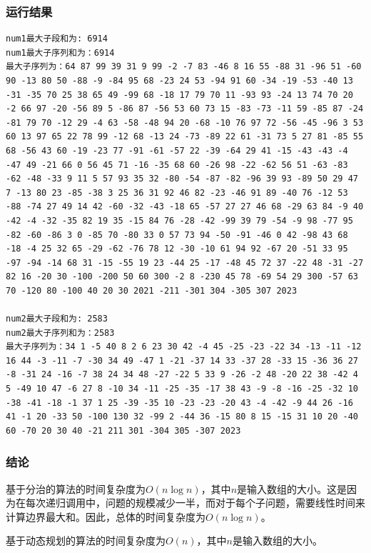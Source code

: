 \documentclass[lang=cn,11pt,a4paper]{elegantpaper}
\begin{document}
\subsubsection{运行结果}
\begin{lstlisting}[language=text]
num1最大子段和为: 6914
num1最大子序列和为：6914
最大子序列为：64 87 99 39 31 9 99 -2 -7 83 -46 8 16 55 -88 31 -96 51 -60 90 -13 80 50 -88 -9 -84 95 68 -23 24 53 -94 91 60 -34 -19 -53 -40 13 -31 -35 70 25 38 65 49 -99 68 -18 17 79 70 11 -93 93 -24 13 74 70 20 -2 66 97 -20 -56 89 5 -86 87 -56 53 60 73 15 -83 -73 -11 59 -85 87 -24 -81 79 70 -12 29 -4 63 -58 -48 94 20 -68 -10 76 97 72 -56 -45 -96 3 53 60 13 97 65 22 78 99 -12 68 -13 24 -73 -89 22 61 -31 73 5 27 81 -85 55 68 -56 43 60 -19 -23 77 -91 -61 -57 22 -39 -64 29 41 -15 -43 -43 -4 -47 49 -21 66 0 56 45 71 -16 -35 68 60 -26 98 -22 -62 56 51 -63 -83 -62 -48 -33 9 11 5 57 93 35 32 -80 -54 -87 -82 -96 39 93 -89 50 29 47 7 -13 80 23 -85 -38 3 25 36 31 92 46 82 -23 -46 91 89 -40 76 -12 53 -88 -74 27 49 14 42 -60 -32 -43 -18 65 -57 27 27 46 68 -29 63 84 -9 40 -42 -4 -32 -35 82 19 35 -15 84 76 -28 -42 -99 39 79 -54 -9 98 -77 95 -82 -60 -86 3 0 -85 70 -80 33 0 57 73 94 -50 -91 -46 0 42 -98 43 68 -18 -4 25 32 65 -29 -62 -76 78 12 -30 -10 61 94 92 -67 20 -51 33 95 -97 -94 -14 68 31 -15 -55 19 23 -44 25 -17 -48 45 72 37 -22 48 -31 -27 82 16 -20 30 -100 -200 50 60 300 -2 8 -230 45 78 -69 54 29 300 -57 63 70 -120 80 -100 40 20 30 2021 -211 -301 304 -305 307 2023

num2最大子段和为: 2583
num2最大子序列和为：2583
最大子序列为：34 1 -5 40 8 2 6 23 30 42 -4 45 -25 -23 -22 34 -13 -11 -12 16 44 -3 -11 -7 -30 34 49 -47 1 -21 -37 14 33 -37 28 -33 15 -36 36 27 -8 -31 24 -16 -7 38 24 34 48 -27 -22 5 33 9 -26 -2 48 -20 22 38 -42 4 5 -49 10 47 -6 27 8 -10 34 -11 -25 -35 -17 38 43 -9 -8 -16 -25 -32 10 -38 -41 -18 -1 37 1 25 -39 -35 10 -23 -23 -20 43 -4 -42 -9 44 26 -16 41 -1 20 -33 50 -100 130 32 -99 2 -44 36 -15 80 8 15 -15 31 10 20 -40 60 -70 20 30 40 -21 211 301 -304 305 -307 2023
\end{lstlisting}
\subsubsection{结论}
基于分治的算法的时间复杂度为$O(n\log n)$，其中$n$是输入数组的大小。这是因为在每次递归调用中，问题的规模减少一半，而对于每个子问题，需要线性时间来计算边界最大和。因此，总体的时间复杂度为$O(n\log n)$。

基于动态规划的算法的时间复杂度为$O(n)$，其中$n$是输入数组的大小。
\end{document}
